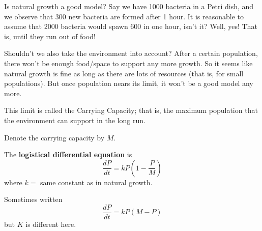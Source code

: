 Is natural growth a good model? Say we have 1000 bacteria in a Petri
dish, and we observe that 300 new bacteria are formed after 1 hour.
It is reasonable to assume that 2000 bacteria would spawn 600 in one hour,
isn't it? Well, yes! That is, until they run out of food!

Shouldn't we also take the environment into account? After
a certain population, there won't be enough food/space to
support any more growth. So it seems like natural growth is fine
as long as there are lots of resources (that is, for small populations).
But once population nears its limit, it won't be a good model any more.

This limit is called the Carrying Capacity; that is, the maximum population
that the environment can support in the long run.

Denote the carrying capacity by $ M $.

\begin{Definition}{}{}
    The \textbf{logistical differential equation} is
    \[ \frac{dP}{dt}=kP\left( 1-\frac{P}{M}  \right) \]
    where $ k =$ same constant as in natural growth.
\end{Definition}
\begin{Remark}{}{}
    Sometimes written
    \[ \frac{dP}{dt}=kP(M-P)  \]
    but $ K $ is different here.
\end{Remark}

